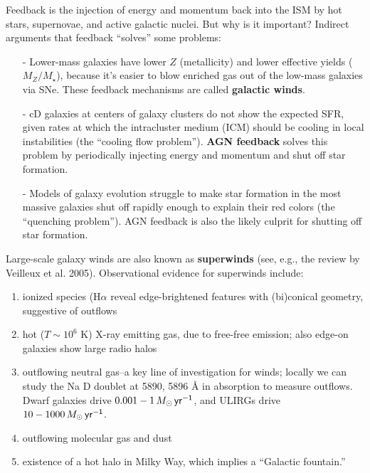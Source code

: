 \documentclass{tufte-handout}
\renewcommand{\textbf}[1]{{\bf \textcolor{dark-gray}{#1}}}
\renewcommand{\rm}{\sf}
\begin{document}
Feedback is the injection of energy and momentum back into the ISM by hot stars, supernovae, and active galactic nuclei. But why is it important? Indirect arguments that feedback ``solves'' some problems:
\begin{itemize}
\item[-] Lower-mass galaxies have lower $Z$ (metallicity) and lower effective yields ($M_Z/M_\star$), because it's easier to blow enriched gas out of the low-mass galaxies via SNe. These feedback mechanisms are called \textbf{galactic winds}.
\item[-] cD galaxies at centers of galaxy clusters do not show the expected SFR, given rates at which the intracluster medium (ICM) should be cooling in local instabilities (the ``cooling flow problem''). \textbf{AGN feedback} solves this problem by periodically injecting energy and momentum and shut off star formation.
\item[-] Models of galaxy evolution struggle to make star formation in the most massive galaxies shut off rapidly enough to explain their red colors (the ``quenching problem''). AGN feedback is also the likely culprit for shutting off star formation.
\end{itemize}

Large-scale galaxy winds are also known as \textbf{superwinds} (see, e.g., the review by Veilleux et al. 2005). Observational evidence for superwinds include:
\begin{enumerate}
\item ionized species (H$\alpha$ reveal edge-brightened features with (bi)conical geometry, suggestive of outflows
\item hot ($T\sim 10^6$ K) X-ray emitting gas, due to free-free emission; also edge-on galaxies show large radio halos
\item outflowing neutral gas--a key line of investigation for winds; locally we can study the Na D doublet at 5890, 5896 \AA{} in absorption to measure outflows. Dwarf galaxies drive $0.001-1\, M_\odot \,\rm yr^{-1}$, and ULIRGs drive $10-1000\, M_\odot\,\rm yr^{-1}$.
\item outflowing molecular gas and dust
\item existence of a hot halo in Milky Way, which implies a ``Galactic fountain.''
\end{enumerate}
\end{document}
